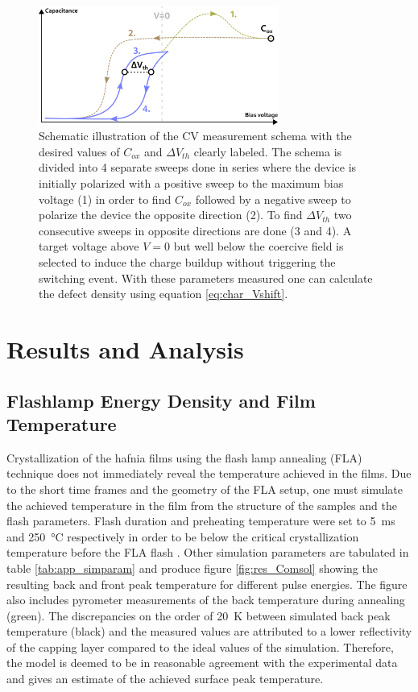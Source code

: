 \documentclass[11pt,twoside,final]{eitExjobb}  %
\begin{document}
\begin{figure}[htbp]
    \centering
    \includegraphics[width=0.70\textwidth]{fig/img/UniCV.png}
    \caption{Schematic illustration of the CV measurement schema with the
    desired values of $C_{ox}$ and $\Delta V_{th}$ clearly labeled. The schema
    is divided into 4 separate sweeps done in series where the device is initially
    polarized with a positive sweep to the maximum bias voltage (1) in order to
    find $C_{ox}$ followed by a negative sweep to polarize the device the opposite
    direction (2). To find $\Delta V_{th}$ two consecutive sweeps in opposite
    directions are done (3 and 4). A target voltage above $V=0$ but well below the coercive
    field is selected to induce the charge buildup without triggering the switching
    event. With these parameters measured one can calculate the defect density
    using equation \ref{eq:char_Vshift}.}
    \label{fig:char_CV}
\end{figure}

\chapter{Results and Analysis}\label{ch:res}

\section{Flashlamp Energy Density and Film Temperature}
Crystallization of the hafnia films using the flash lamp annealing (FLA)
technique does not immediately reveal the temperature achieved in the films. Due
to the short time frames and the geometry of the FLA setup, one must simulate
the achieved temperature in the film from the structure of the samples and the
flash parameters. Flash duration and preheating temperature were set to
\SI{5}{\milli\second} and \SI{250}{\celsius} respectively in order to be below
the critical crystallization temperature before the FLA
flash \cite{migita2019phase}. Other simulation parameters are tabulated in
table \ref{tab:app_simparam} and produce figure \ref{fig:res_Comsol} showing the
resulting back and front peak temperature for different pulse energies. The figure also
includes pyrometer measurements of the back temperature during annealing
(green). The discrepancies on the order of \SI{20}{\kelvin} between simulated
back peak temperature (black) and the measured values are attributed to a 
lower reflectivity of the  capping layer compared to the ideal values of
the simulation. Therefore, the model is deemed to be in reasonable agreement
with the experimental data and gives an estimate of the achieved surface peak temperature.
\end{document}
